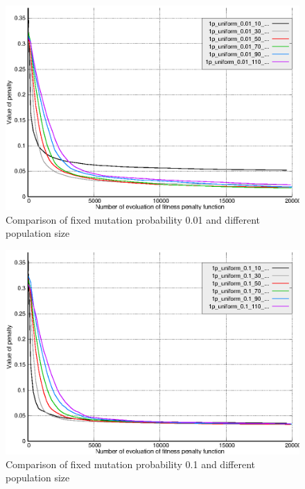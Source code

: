 \documentclass[12pt]{report}
\begin{document}
\begin{figure}
    \centering
    \includegraphics[width=5.0in]{mppscomparison001}
    \caption{Comparison of fixed mutation probability 0.01 and different population size}
    \label{mppscomparison001}
\end{figure}

\begin{figure}
    \centering
    \includegraphics[width=5.0in]{mppscomparison01}
    \caption{Comparison of fixed mutation probability 0.1 and different population size}
    \label{mppscomparison01}
\end{figure}
\end{document}

